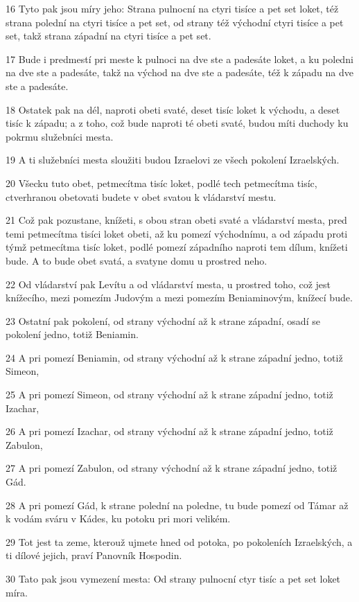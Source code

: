 \par 16 Tyto pak jsou míry jeho: Strana pulnocní na ctyri tisíce a pet set loket, též strana polední na ctyri tisíce a pet set, od strany též východní ctyri tisíce a pet set, takž strana západní na ctyri tisíce a pet set.
\par 17 Bude i predmestí pri meste k pulnoci na dve ste a padesáte loket, a ku poledni na dve ste a padesáte, takž na východ na dve ste a padesáte, též k západu na dve ste a padesáte.
\par 18 Ostatek pak na dél, naproti obeti svaté, deset tisíc loket k východu, a deset tisíc k západu; a z toho, což bude naproti té obeti svaté, budou míti duchody ku pokrmu služebníci mesta.
\par 19 A ti služebníci mesta sloužiti budou Izraelovi ze všech pokolení Izraelských.
\par 20 Všecku tuto obet, petmecítma tisíc loket, podlé tech petmecítma tisíc, ctverhranou obetovati budete v obet svatou k vládarství mestu.
\par 21 Což pak pozustane, knížeti, s obou stran obeti svaté a vládarství mesta, pred temi petmecítma tisíci loket obeti, až ku pomezí východnímu, a od západu proti týmž petmecítma tisíc loket, podlé pomezí západního naproti tem dílum, knížeti bude. A to bude obet svatá, a svatyne domu u prostred neho.
\par 22 Od vládarství pak Levítu a od vládarství mesta, u prostred toho, což jest knížecího, mezi pomezím Judovým a mezi pomezím Beniaminovým, knížecí bude.
\par 23 Ostatní pak pokolení, od strany východní až k strane západní, osadí se pokolení jedno, totiž Beniamin.
\par 24 A pri pomezí Beniamin, od strany východní až k strane západní jedno, totiž Simeon,
\par 25 A pri pomezí Simeon, od strany východní až k strane západní jedno, totiž Izachar,
\par 26 A pri pomezí Izachar, od strany východní až k strane západní jedno, totiž Zabulon,
\par 27 A pri pomezí Zabulon, od strany východní až k strane západní jedno, totiž Gád.
\par 28 A pri pomezí Gád, k strane polední na poledne, tu bude pomezí od Támar až k vodám sváru v Kádes, ku potoku pri mori velikém.
\par 29 Tot jest ta zeme, kterouž ujmete hned od potoka, po pokoleních Izraelských, a ti dílové jejich, praví Panovník Hospodin.
\par 30 Tato pak jsou vymezení mesta: Od strany pulnocní ctyr tisíc a pet set loket míra.
